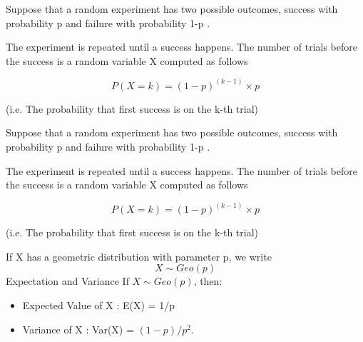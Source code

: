 \documentclass[]{report}
\begin{document}
{	
	Suppose that a random experiment has two possible outcomes, success
	with probability p and failure with probability 1-p .
	
	
	The experiment is repeated until a success happens. The number of
	trials before the success is a random variable X computed as follows
	
	\[P(X = k) = (1-p)^{(k-1)}\times p \]
	
	
	(i.e. The probability that first success is on the k-th trial)
}


	
	
	Suppose that a random experiment has two possible outcomes, success
	with probability p and failure with probability 1-p .
	
	
	The experiment is repeated until a success happens. The number of
	trials before the success is a random variable X computed as follows
	
	\[P(X = k) = (1-p)^{(k-1)}\times p \]
	
	
	(i.e. The probability that first success is on the k-th trial)
	
	
	If X has a geometric distribution with parameter p, we write
	\[X \sim Geo(p) \]
	Expectation and Variance
	If $X \sim Geo(p)$, then:
	
	\begin{itemize}
		\item Expected Value of X : E(X) = 1/p
		\item Variance of X : Var(X) = $(1-p)/p^2$.
	\end{itemize}




	
\end{document}
